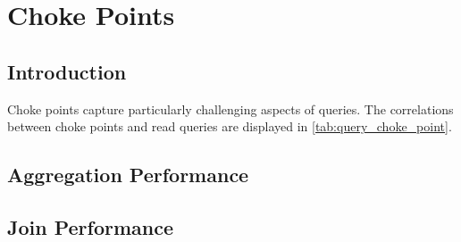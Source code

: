 \chapter{Choke Points}
\label{sec:choke-points}

\newcommand{\tpcCard}[1]{\colorbox{lightgray}{\tt TPC-H #1}}
\newcommand{\cpSection}[4][]{%
\subsection*{%
CP-#2: [#3] #4%
\ifthenelse{\equal{#1}{}}{}{\hfill \tpcCard{#1}}%
}%
\label{choke_point_#2}}


\section*{Introduction}

Choke points capture particularly challenging aspects of queries.
The correlations between choke points and read queries are displayed in \autoref{tab:query_choke_point}.

{
\setlength{\tabcolsep}{.05em}

}


\section{Aggregation Performance}







\section{Join Performance}

